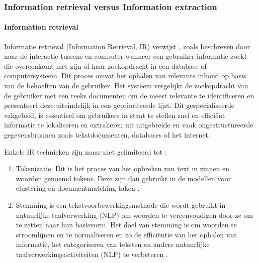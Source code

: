 \subsubsection{Information retrieval versus Information extraction}
\paragraph{Information retrieval}
Informatie retrieval (Information Retrieval, IR) verwijst , zoals beschreven door\textcite{Krallinger2024} naar de interactie tussens en computer wanneer een gebruiker informatie zoekt die overeenkomt met zijn of haar zoekopdracht in een database of computersysteem. Dit proces omvat het ophalen van relevante inhoud op basis van de behoeften van de gebruiker. Het systeem vergelijkt de zoekopdracht van de gebruiker met een reeks documenten om de meest relevante te identificeren en presenteert deze uiteindelijk in een geprioriteerde lijst. Dit gespecialiseerde vakgebied, is essentieel om gebruikers in staat te stellen snel en efficiënt informatie te lokaliseren en extraheren uit uitgebreide en vaak ongestructureerde gegevensbronnen zoals tekstdocumenten, databases of het internet.

Enkele IR technieken zijn maar niet gelimiteerd tot \autocite{IBM2024}:
\begin{enumerate}
    \item Tokenizatie: Dit is het proces van het opbreken van text in zinnen en woorden genoemd tokens. Deze zijn dan gebruikt in de modellen voor clustering en documentmatching taken \autocite{IBM2024}.
    \item Stemming is een tekstvoorbewerkingsmethode die wordt gebruikt in natuurlijke taalverwerking (NLP) om woorden te vereenvoudigen door ze om te zetten naar hun basisvorm. Het doel van stemming is om woorden te stroomlijnen en te normaliseren en zo de efficiëntie van het ophalen van informatie, het categoriseren van teksten en andere natuurlijke taalverwerkingsactiviteiten (NLP) te verbeteren \autocite{SC2024}.
\end{enumerate}

